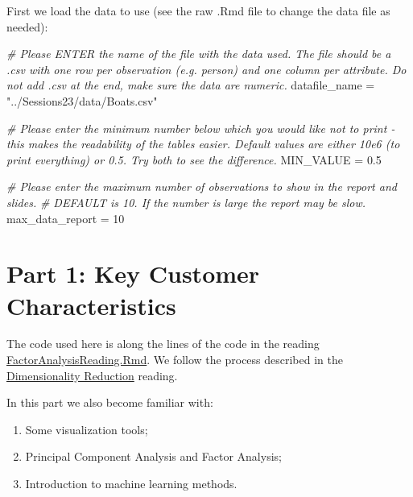 \documentclass[
]{article}
\newenvironment{Shaded}{\begin{snugshade}}{\end{snugshade}}
\newcommand{\CommentTok}[1]{\textcolor[rgb]{0.56,0.35,0.01}{\textit{#1}}}
\newcommand{\DecValTok}[1]{\textcolor[rgb]{0.00,0.00,0.81}{#1}}
\newcommand{\FloatTok}[1]{\textcolor[rgb]{0.00,0.00,0.81}{#1}}
\newcommand{\NormalTok}[1]{#1}
\newcommand{\OtherTok}[1]{\textcolor[rgb]{0.56,0.35,0.01}{#1}}
\newcommand{\StringTok}[1]{\textcolor[rgb]{0.31,0.60,0.02}{#1}}
\providecommand{\tightlist}{%
  \setlength{\itemsep}{0pt}\setlength{\parskip}{0pt}}
\begin{document}
First we load the data to use (see the raw .Rmd file to change the data
file as needed):

\begin{Shaded}
\begin{Highlighting}[]
\CommentTok{\# Please ENTER the name of the file with the data used. The file should be a .csv with one row per observation (e.g. person) and one column per attribute. Do not add .csv at the end, make sure the data are numeric.}
\NormalTok{datafile\_name }\OtherTok{=} \StringTok{"../Sessions23/data/Boats.csv"}

\CommentTok{\# Please enter the minimum number below which you would like not to print {-} this makes the readability of the tables easier. Default values are either 10e6 (to print everything) or 0.5. Try both to see the difference.}
\NormalTok{MIN\_VALUE }\OtherTok{=} \FloatTok{0.5}

\CommentTok{\# Please enter the maximum number of observations to show in the report and slides. }
\CommentTok{\# DEFAULT is 10. If the number is large the report may be slow.}
\NormalTok{max\_data\_report }\OtherTok{=} \DecValTok{10}
\end{Highlighting}
\end{Shaded}

\clearpage

\hypertarget{part-1-key-customer-characteristics}{%
\section{Part 1: Key Customer
Characteristics}\label{part-1-key-customer-characteristics}}

The code used here is along the lines of the code in the reading
\href{https://github.com/InseadDataAnalytics/INSEADAnalytics/blob/master/CourseSessions/Sessions23/FactorAnalysisReading.Rmd}{FactorAnalysisReading.Rmd}.
We follow the process described in the
\href{http://inseaddataanalytics.github.io/INSEADAnalytics/CourseSessions/Sessions23/FactorAnalysisReading.html}{Dimensionality
Reduction} reading.

In this part we also become familiar with:

\begin{enumerate}
\def\labelenumi{\arabic{enumi}.}
\tightlist
\item
  Some visualization tools;
\item
  Principal Component Analysis and Factor Analysis;
\item
  Introduction to machine learning methods.
\end{enumerate}
\end{document}
